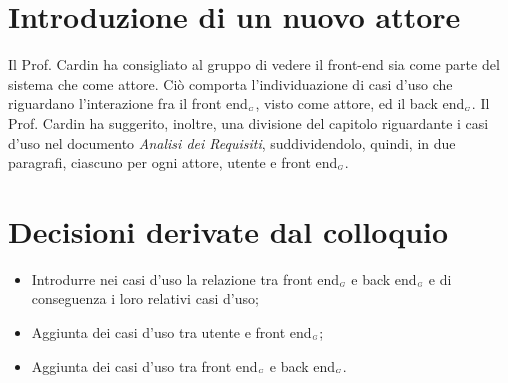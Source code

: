 \section{Introduzione di un nuovo attore}
Il Prof. Cardin ha consigliato al gruppo di vedere il front-end sia come parte del sistema che come attore. Ciò comporta l'individuazione di casi d'uso che riguardano l'interazione fra il front end$_{\scaleto{G}{3pt}}$, visto come attore, ed il back end$_{\scaleto{G}{3pt}}$. Il Prof. Cardin ha suggerito, inoltre, una divisione del capitolo riguardante i casi d'uso nel documento \textit{Analisi dei Requisiti}, suddividendolo, quindi, in due paragrafi, ciascuno per ogni attore, utente e front end$_{\scaleto{G}{3pt}}$.
\section{Decisioni derivate dal colloquio}
\begin{itemize}
	\item Introdurre nei casi d'uso la relazione tra front end$_{\scaleto{G}{3pt}}$ e back end$_{\scaleto{G}{3pt}}$ e di conseguenza i loro relativi casi d'uso;
	\item Aggiunta dei casi d'uso tra utente e front end$_{\scaleto{G}{3pt}}$;
	\item Aggiunta dei casi d'uso tra front end$_{\scaleto{G}{3pt}}$ e back end$_{\scaleto{G}{3pt}}$.
\end{itemize}
